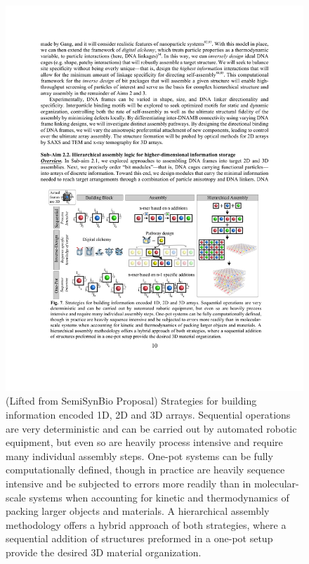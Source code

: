 \begin{figure}[t]
\begin{center}
\includegraphics[width=6.5in]{../figures/SemiSynBio.pdf}
\caption{
(Lifted from SemiSynBio Proposal) Strategies for building information encoded 1D, 2D and 3D arrays. Sequential operations are very deterministic and can be carried out by automated robotic equipment, but even so are heavily process intensive and require many individual assembly steps. One-pot systems can be fully computationally defined, though in practice are heavily sequence intensive and be subjected to errors more readily than in molecular- scale systems when accounting for kinetic and thermodynamics of packing larger objects and materials. A hierarchical assembly methodology offers a hybrid approach of both strategies, where a sequential addition of structures preformed in a one-pot setup provide the desired 3D material organization.}
\label{fig:semisynbio}
\end{center}
\end{figure}